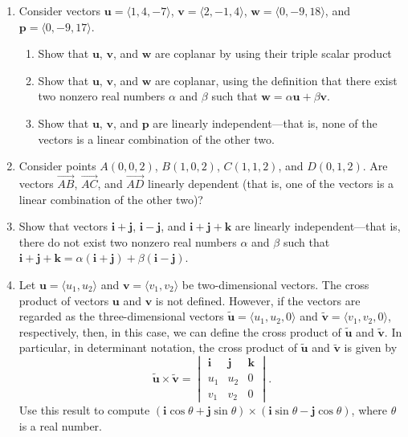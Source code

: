 \documentclass{exercises}
\begin{document}
\begin{enumerate}[resume]
\item Consider vectors $\mathbf{u}=\langle1,4,-7\rangle$, $\mathbf{v}=\langle2,-1,4\rangle$, $\mathbf{w}=\langle0,-9,18\rangle$, and $\mathbf{p}=\langle0,-9,17\rangle$.
\begin{enumerate}[label=(\alph*)]
  \item Show that $\mathbf{u}$, $\mathbf{v}$, and $\mathbf{w}$ are coplanar by using their triple scalar product
  \item Show that $\mathbf{u}$, $\mathbf{v}$, and $\mathbf{w}$ are coplanar, using the definition that there exist two nonzero real numbers $\alpha$ and $\beta$ such that $\mathbf{w}=\alpha \mathbf{u}+\beta \mathbf{v}$.
  \item Show that $\mathbf{u}$, $\mathbf{v}$, and $\mathbf{p}$ are linearly independent---that is, none of the vectors is a linear combination of the other two.
\end{enumerate}
\item Consider points $A(0,0,2)$, $B(1,0,2)$, $C(1,1,2)$, and $D(0,1,2)$. Are vectors $\overset{\to}{AB}$, $\overset{\to}{AC}$, and $\overset{\to}{AD}$ linearly dependent (that is, one of the vectors is a linear combination of the other two)?
\item Show that vectors $\mathbf{i}+\mathbf{j}$, $\mathbf{i}-\mathbf{j}$, and $\mathbf{i}+\mathbf{j}+\mathbf{k}$ are linearly independent---that is, there do not exist two nonzero real numbers $\alpha$ and $\beta$ such that $\mathbf{i}+\mathbf{j}+\mathbf{k}=\alpha(\mathbf{i}+\mathbf{j})+\beta(\mathbf{i}-\mathbf{j})$.
\item Let $\mathbf{u}=\langle u_{1},u_{2}\rangle$ and $\mathbf{v}=\langle v_{1},v_{2}\rangle$ be two-dimensional vectors. The cross product of vectors $\mathbf{u}$ and $\mathbf{v}$ is not defined. However, if the vectors are regarded as the three-dimensional vectors $\tilde{\mathbf{u}}=\langle u_{1},u_{2},0\rangle$ and $\tilde{\mathbf{v}}=\langle v_{1},v_{2},0\rangle$, respectively, then, in this case, we can define the cross product of $\tilde{\mathbf{u}}$ and $\tilde{\mathbf{v}}$. In particular, in determinant notation, the cross product of $\tilde{\mathbf{u}}$ and $\tilde{\mathbf{v}}$ is given by \[\tilde{\mathbf{u}}\times \tilde{\mathbf{v}}=\begin{vmatrix}\mathbf{i} & \mathbf{j} & \mathbf{k} \\ u_{1} & u_{2} & 0 \\ v_{1} & v_{2} & 0\end{vmatrix}.\] Use this result to compute $(\mathbf{i}\cos \theta+\mathbf{j}\sin \theta)\times (\mathbf{i}\sin \theta-\mathbf{j}\cos \theta)$, where $\theta$ is a real number.

\end{enumerate}
\end{document}
